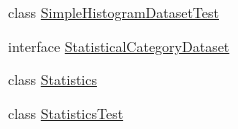 \begin{DoxyCompactItemize}
\item 
class \mbox{\hyperlink{classorg_1_1jfree_1_1data_1_1statistics_1_1_simple_histogram_dataset_test}{Simple\+Histogram\+Dataset\+Test}}
\item 
interface \mbox{\hyperlink{interfaceorg_1_1jfree_1_1data_1_1statistics_1_1_statistical_category_dataset}{Statistical\+Category\+Dataset}}
\item 
class \mbox{\hyperlink{classorg_1_1jfree_1_1data_1_1statistics_1_1_statistics}{Statistics}}
\item 
class \mbox{\hyperlink{classorg_1_1jfree_1_1data_1_1statistics_1_1_statistics_test}{Statistics\+Test}}
\end{DoxyCompactItemize}
